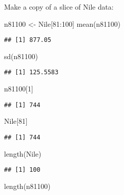 \documentclass[
]{article}
\newenvironment{Shaded}{\begin{snugshade}}{\end{snugshade}}
\newcommand{\DecValTok}[1]{\textcolor[rgb]{0.00,0.00,0.81}{#1}}
\newcommand{\FunctionTok}[1]{\textcolor[rgb]{0.00,0.00,0.00}{#1}}
\newcommand{\NormalTok}[1]{#1}
\newcommand{\OtherTok}[1]{\textcolor[rgb]{0.56,0.35,0.01}{#1}}
\newcommand{\SpecialCharTok}[1]{\textcolor[rgb]{0.00,0.00,0.00}{#1}}
\begin{document}
Make a copy of a slice of Nile data:

\begin{Shaded}
\begin{Highlighting}[]
\NormalTok{n81100 }\OtherTok{\textless{}{-}}\NormalTok{ Nile[}\DecValTok{81}\SpecialCharTok{:}\DecValTok{100}\NormalTok{]}
\FunctionTok{mean}\NormalTok{(n81100)}
\end{Highlighting}
\end{Shaded}

\begin{verbatim}
## [1] 877.05
\end{verbatim}

\begin{Shaded}
\begin{Highlighting}[]
\FunctionTok{sd}\NormalTok{(n81100)}
\end{Highlighting}
\end{Shaded}

\begin{verbatim}
## [1] 125.5583
\end{verbatim}

\begin{Shaded}
\begin{Highlighting}[]
\NormalTok{n81100[}\DecValTok{1}\NormalTok{]}
\end{Highlighting}
\end{Shaded}

\begin{verbatim}
## [1] 744
\end{verbatim}

\begin{Shaded}
\begin{Highlighting}[]
\NormalTok{Nile[}\DecValTok{81}\NormalTok{]}
\end{Highlighting}
\end{Shaded}

\begin{verbatim}
## [1] 744
\end{verbatim}

\begin{Shaded}
\begin{Highlighting}[]
\FunctionTok{length}\NormalTok{(Nile)}
\end{Highlighting}
\end{Shaded}

\begin{verbatim}
## [1] 100
\end{verbatim}

\begin{Shaded}
\begin{Highlighting}[]
\FunctionTok{length}\NormalTok{(n81100)}
\end{Highlighting}
\end{Shaded}
\end{document}
